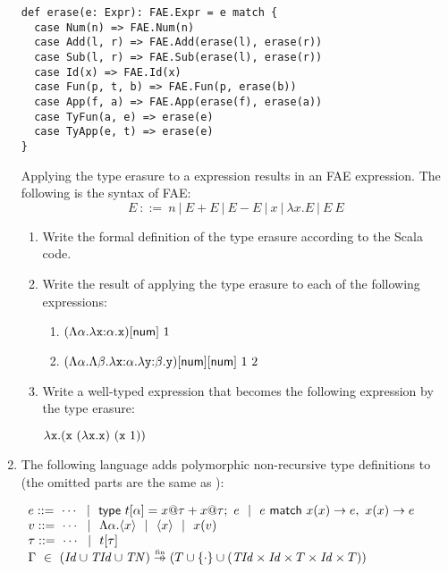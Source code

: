 \begin{enumerate}
\begin{verbatim}
def erase(e: Expr): FAE.Expr = e match {
  case Num(n) => FAE.Num(n)
  case Add(l, r) => FAE.Add(erase(l), erase(r))
  case Sub(l, r) => FAE.Sub(erase(l), erase(r))
  case Id(x) => FAE.Id(x)
  case Fun(p, t, b) => FAE.Fun(p, erase(b))
  case App(f, a) => FAE.App(erase(f), erase(a))
  case TyFun(a, e) => erase(e)
  case TyApp(e, t) => erase(e)
}
\end{verbatim}
Applying the type erasure to a \lang expression results in an \textsf{FAE} expression.
The following is the syntax of \textsf{FAE}:
\[
E\ ::=\ n
\ |\ E+E
\ |\ E-E
\ |\ x
\ |\ \lambda x.E
\ |\ E\ E
\]
\begin{enumerate}
  \item Write the formal definition of the type erasure
     according to the Scala code.
\item Write the result of applying the type erasure to each of the following
  expressions:
    \begin{enumerate}
      \item $\etapp{(\etfun{\alpha}{\efunt{\cx}{\alpha}{\cx}})}{\tnum}\ 1$
      \item $\etapp{\etapp{(\etfun{\alpha}{\etfun{\beta}{
          \efunt{\cx}{\alpha}{\efunt{\cy}{\beta}{\cy}}}})}{\tnum}}{\tnum}\ 1\ 2$
    \end{enumerate}
\item Write a well-typed expression that becomes the following
  expression by the type erasure:

    $\efun{\cx}{(\cx\ (\efun{\cx}{\cx})\ (\cx\ 1))}$
\end{enumerate}

\item The following language adds
polymorphic non-recursive type definitions to \texttt{\lang}
(the omitted parts are the same as \texttt{\lang}):

\vspace{1em}
$
  \begin{array}{l}
    e ::=\ \cdots\ \ |\ \ \textsf{type}\ t[\alpha]=x@\tau+x@\tau;\ e\ \ |\ \
           e\ \textsf{match}\ x(x)\rightarrow e,\ x(x)\rightarrow e \\
    v ::=\ \cdots\ \ |\ \ \Lambda\alpha.\langle x\rangle\ \ |\ \ \langle x\rangle\ \ |\ \  x(v) \\
    \tau ::=\ \cdots\ \ |\ \  t[\tau] \\
    \Gamma\ \in\ (\embox{Id}\cup\embox{TId}\cup\embox{TN})\finto
    {(T\cup\{\cdot\}
    \cup(\embox{TId}\times\embox{Id}\times T\times\embox{Id}\times T))}
  \end{array}
$
\vspace{0.5em}


\end{enumerate}
